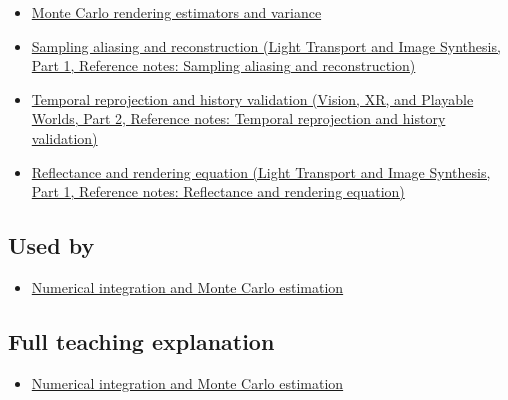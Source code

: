 \hypertarget{appendix-68be451b78b1-prerequisites}{}

\begin{itemize}
\tightlist
\item
  \hyperref[appendix-031e02bf28af]{Monte Carlo rendering estimators and variance}
\item
  \href{../04-Light-Transport-and-Image-Synthesis-P01/main.pdf\#nameddest=appendix-6a7869dd79a6}{Sampling aliasing and reconstruction (Light Transport and Image Synthesis, Part 1, Reference notes: Sampling aliasing and reconstruction)}
\item
  \href{../07-Vision-XR-and-Playable-Worlds-P02/main.pdf\#nameddest=appendix-0727340a4428}{Temporal reprojection and history validation (Vision, XR, and Playable Worlds, Part 2, Reference notes: Temporal reprojection and history validation)}
\item
  \href{../04-Light-Transport-and-Image-Synthesis-P01/main.pdf\#nameddest=appendix-96da0b153b77}{Reflectance and rendering equation (Light Transport and Image Synthesis, Part 1, Reference notes: Reflectance and rendering equation)}
\end{itemize}

\subsection{Used by}\label{appendix-68be451b78b1-used-by}

\hypertarget{appendix-68be451b78b1-used-by}{}

\begin{itemize}
\tightlist
\item
  \hyperref[03-visual-computing-i-ch012-numerical-integration-and-monte-carlo-estimation]{Numerical integration and Monte Carlo estimation}
\end{itemize}

\subsection{Full teaching explanation}\label{appendix-68be451b78b1-full-teaching-explanation}

\hypertarget{appendix-68be451b78b1-full-teaching-explanation}{}

\begin{itemize}
\tightlist
\item
  \hyperref[03-visual-computing-i-ch012-numerical-integration-and-monte-carlo-estimation]{Numerical integration and Monte Carlo estimation}
\end{itemize}

